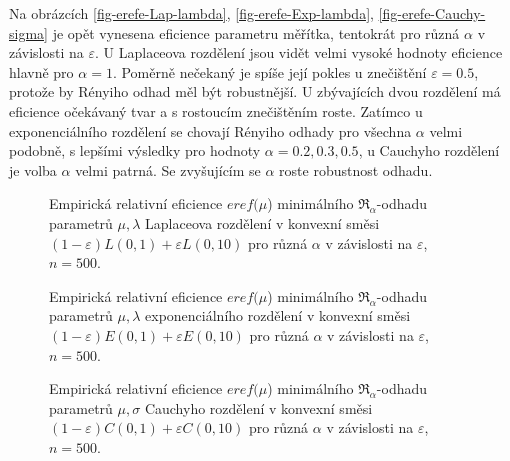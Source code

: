 Na obrázcích \ref{fig-erefe-Lap-lambda}, \ref{fig-erefe-Exp-lambda}, \ref{fig-erefe-Cauchy-sigma} je opět vynesena eficience parametru měřítka, tentokrát pro různá $\alpha$ v závislosti na $\varepsilon$. U Laplaceova rozdělení jsou vidět velmi vysoké hodnoty eficience hlavně pro $\alpha = 1$. Poměrně nečekaný je spíše její pokles u znečištění $\varepsilon = 0.5$, protože by Rényiho odhad měl být robustnější. U zbývajících dvou rozdělení má eficience očekávaný tvar a s rostoucím znečištěním roste. Zatímco u exponenciálního rozdělení se chovají Rényiho odhady pro všechna $\alpha$ velmi podobně, s lepšími výsledky pro hodnoty $\alpha = 0.2, 0.3, 0.5$, u Cauchyho rozdělení je volba $\alpha$ velmi patrná. Se zvyšujícím se $\alpha$ roste robustnost odhadu.

\begin{figure}[htb!]
	\begin{center}
		\caption{ Empirická relativní eficience $eref({\mu}$) minimálního $\mathfrak{R}_\alpha$-odhadu parametrů  $\mu,\lambda$ Laplaceova rozdělení v konvexní směsi	$(1-\varepsilon)L(0,1) + \varepsilon L(0,10)$ pro různá $\alpha$ v závislosti na $\varepsilon$, $n=500$. }
		\label{fig-erefe-Lap-mu}
	\end{center}
\end{figure}

\begin{figure}[htb!]
	\begin{center}
		\caption{ Empirická relativní eficience $eref({\mu}$) minimálního $\mathfrak{R}_\alpha$-odhadu parametrů  $\mu,\lambda$ exponenciálního rozdělení v konvexní směsi	$(1-\varepsilon)E(0,1) + \varepsilon E(0,10)$ pro různá $\alpha$ v závislosti na $\varepsilon$, $n=500$. }
		\label{fig-erefe-Exp-mu}
	\end{center}
\end{figure}

\begin{figure}[htb!]
	\begin{center}
		\caption{ Empirická relativní eficience $eref({\mu}$) minimálního $\mathfrak{R}_\alpha$-odhadu parametrů  $\mu,\sigma$ Cauchyho rozdělení v konvexní směsi	$(1-\varepsilon)C(0,1) + \varepsilon C(0,10)$ pro různá $\alpha$ v závislosti na $\varepsilon$, $n=500$. }
		\label{fig-erefe-Cauchy-mu}
	\end{center}
\end{figure}

